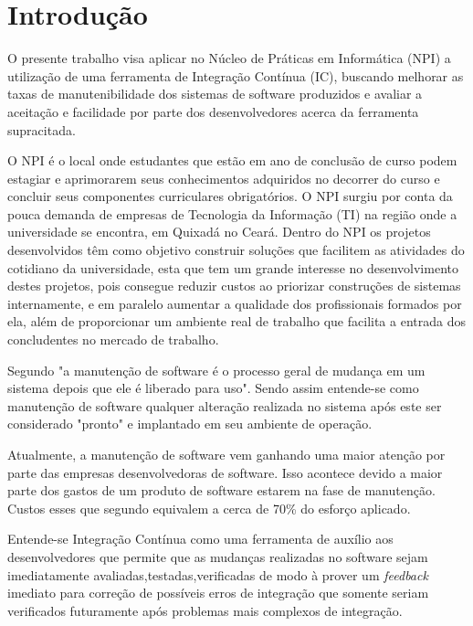 \chapter*[Introdução]{Introdução}

O presente trabalho visa aplicar no Núcleo de Práticas em Informática (NPI) a utilização de uma ferramenta de Integração Contínua (IC), buscando melhorar as taxas de manutenibilidade dos sistemas de software produzidos e avaliar a aceitação e facilidade por parte dos desenvolvedores acerca da ferramenta supracitada.

O NPI é o local onde estudantes que estão em ano de conclusão de curso podem estagiar e aprimorarem seus conhecimentos adquiridos no decorrer do curso e concluir seus componentes curriculares obrigatórios. O NPI surgiu por conta da pouca demanda de empresas de Tecnologia da Informação (TI) na região onde a universidade se encontra, em Quixadá no Ceará. Dentro do NPI os projetos desenvolvidos têm como objetivo construir soluções que facilitem as atividades do cotidiano da universidade, esta que tem um grande interesse no desenvolvimento destes projetos, pois consegue reduzir custos ao priorizar construções de sistemas internamente, e em paralelo aumentar a qualidade dos profissionais formados por ela, além de proporcionar um ambiente real de trabalho que facilita a entrada dos concludentes no mercado de trabalho. \cite{npi2013}

Segundo  "a manutenção de software é o processo geral de mudança em um sistema depois que ele é liberado para uso". Sendo assim entende-se como manutenção de software  qualquer alteração realizada no sistema após este ser considerado "pronto" e implantado em seu ambiente de operação.

Atualmente, a manutenção de software vem ganhando uma maior atenção por parte das empresas desenvolvedoras de software. Isso acontece devido a maior parte dos gastos de um produto de software estarem na fase de manutenção. Custos esses que segundo  equivalem a  cerca de 70\% do esforço aplicado.

Entende-se Integração Contínua como uma ferramenta de auxílio aos desenvolvedores que permite que as mudanças realizadas no software sejam imediatamente avaliadas,testadas,verificadas de modo à prover um  \textit{feedback} imediato para correção de possíveis erros de integração que somente seriam verificados futuramente após problemas mais complexos de integração.\cite{paul2007}

